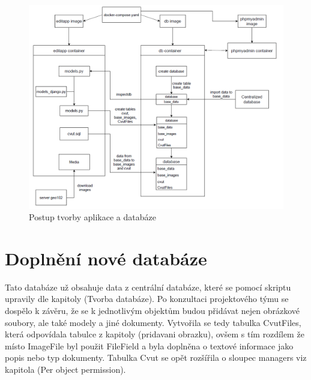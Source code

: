 \begin{figure}[H] \centering
    \includegraphics[width=400pt]{./pictures/diagram-docker.PNG}
    \caption[Postup tvorby aplikace a databáze]{Postup tvorby aplikace a databáze}
	\label{fig:Postup tvorby aplikace a databáze}              
\end{figure}

\newpage

\section{Doplnění nové databáze}

Tato databáze už obsahuje data z centrální databáze, které se pomocí
skriptu upravily dle kapitoly (Tvorba databáze). Po konzultaci
projektového týmu se dospělo k závěru, že se k jednotlivým objektům
budou přidávat nejen obrázkové soubory, ale také modely a jiné
dokumenty. Vytvořila se tedy tabulka CvutFiles, která odpovídala
tabulce z kapitoly (pridavani obrazku), ovšem s tím rozdílem že místo
ImageFile byl použit FileField a byla doplněna o textové informace
jako popis nebo typ dokumenty. Tabulka Cvut se opět rozšířila o
sloupec managers viz kapitola (Per object permission).

